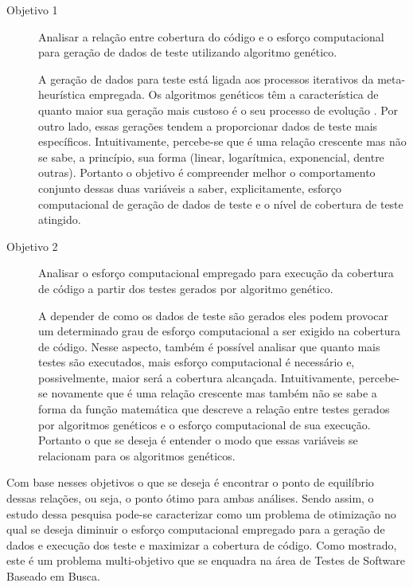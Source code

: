 \makeatletter
\def\namedlabel#1#2{\begingroup
    #2%
    \def\@currentlabel{#2}%
    \label{#1}\endgroup
}
\begin{description}
\item[\namedlabel{obj1}{Objetivo 1}] Analisar a relação entre cobertura do código e o esforço computacional para geração de dados de teste utilizando algoritmo genético.

A geração de dados para teste está ligada aos processos iterativos da meta-heurística empregada. Os algoritmos genéticos têm a característica de quanto maior sua geração mais custoso é o seu processo de evolução \cite{pargas1999test}. Por outro lado, essas gerações tendem a proporcionar dados de teste mais específicos. Intuitivamente, percebe-se que é uma relação crescente mas não se sabe, a princípio, sua forma (linear, logarítmica, exponencial, dentre outras). Portanto o objetivo é compreender melhor o comportamento conjunto dessas duas variáveis a saber, explicitamente, esforço computacional de geração de dados de teste e o  nível de cobertura de teste atingido. 
		

\item[\namedlabel{obj2}{Objetivo 2}] Analisar o esforço computacional empregado para execução da cobertura de código a partir dos testes gerados por algoritmo genético.

A depender de como os dados de teste são gerados eles podem provocar um determinado grau de esforço computacional a ser exigido na cobertura de código.  Nesse aspecto, também é possível analisar que quanto mais testes são executados, mais esforço computacional é necessário e, possivelmente, maior será a cobertura alcançada. Intuitivamente, percebe-se novamente que é uma relação crescente mas também não se sabe a forma da função matemática que descreve a relação entre testes gerados por algoritmos genéticos e o esforço computacional de sua execução. Portanto o que se deseja é entender o modo que essas variáveis se relacionam para os algoritmos genéticos.

\end{description}

Com base nesses objetivos o que se deseja é encontrar o ponto de equilíbrio dessas relações, ou seja,  o ponto ótimo para ambas análises. Sendo assim,  o estudo dessa pesquisa pode-se caracterizar como um problema de otimização no qual se deseja diminuir o esforço computacional empregado para a geração de dados e execução dos teste e maximizar a cobertura de código. Como mostrado, este é um problema multi-objetivo que se enquadra na área de Testes de Software Baseado em Busca.

